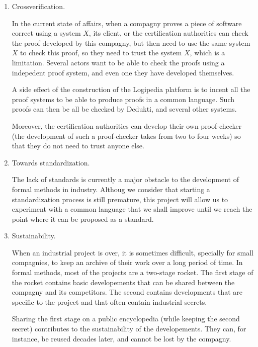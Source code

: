 \begin{enumerate}
\item Crossverification.

In the current state of affairs, when a compagny proves a piece of
software correct using a system $X$, its client, or the certification
authorities can check the proof developed by this compagny, but then
need to use the same system $X$ to check this proof, so they need to
trust the system $X$, which is a limitation. Several actors want to be
able to check the proofs using a indepedent proof system, and even one
they have developed themselves.

A side effect of the construction of the {\sc Logipedia} platform is
to incent all the proof systems to be able to produce proofs in a
common language. Such proofs can then be all be checked by {\sc
Dedukti}, and several other systems.

Moreover, the certification authorities can develop their own
proof-checker (the development of such a proof-checker takes from two
to four weeks) so that they do not need to trust anyone else.

\item Towards standardization.

The lack of standards is currently a major obstacle to the development
of formal methods in industry. Althoug we consider that starting a
standardization process is still premature, this project will allow us
to experiment with a common language that we shall improve until we
reach the point where it can be proposed as a standard.



  



  

\item Sustainability.

When an industrial project is over, it is sometimes difficult,
specially for small compagnies, to keep an archive of their work over
a long period of time. In formal methods, most of the projects are a
two-stage rocket. The first stage of the rocket contains basic
developements that can be shared between the compagny and its
competitors. The second contains developments that are specific to the
project and that often contain industrial secrets.

Sharing the first stage on a public encyclopedia (while keeping the
second secret) contributes to the sustainability of the
developements. They can, for instance, be reused decades later, and
cannot be lost by the compagny.


\end{enumerate}
